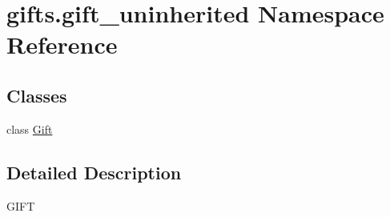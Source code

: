 \hypertarget{namespacegifts_1_1gift__uninherited}{}\section{gifts.\+gift\+\_\+uninherited Namespace Reference}
\label{namespacegifts_1_1gift__uninherited}
\subsection*{Classes}
\begin{DoxyCompactItemize}
\item 
class \hyperlink{classgifts_1_1gift__uninherited_1_1_gift}{Gift}
\end{DoxyCompactItemize}


\subsection{Detailed Description}
\begin{DoxyVerb}GIFT\end{DoxyVerb}
 